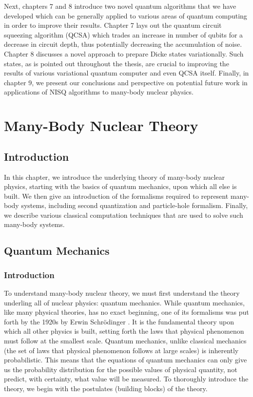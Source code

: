 \documentclass[10pt]{article}
\begin{document}
Next, chapters 7 and 8 introduce two novel quantum algorithms that we have developed which can be generally applied to various areas of quantum computing in order to improve their results. Chapter 7 lays out the quantum circuit squeezing algorithm (QCSA) which trades an increase in number of qubits for a decrease in circuit depth, thus potentially decreasing the accumulation of noise. Chapter 8 discusses a novel approach to prepare Dicke states variationally. Such states, as is pointed out throughout the thesis, are crucial to improving the results of various variational quantum computer and even QCSA itself. Finally, in chapter 9, we present our conclusions and perspective on potential future work in applications of NISQ algorithms to many-body nuclear physics.

\chapter{Many-Body Nuclear Theory}

\section{Introduction} 

In this chapter, we introduce the underlying theory of many-body nuclear physics, starting with the basics of quantum mechanics, upon which all else is built. We then give an introduction of the formalisms required to represent many-body systems, including second quantization and particle-hole formalism. Finally, we describe various classical computation techniques that are used to solve such many-body systems.

\section{Quantum Mechanics}

\subsection{Introduction}

To understand many-body nuclear theory, we must first understand the theory underling all of nuclear physics: quantum mechanics. While quantum mechanics, like many physical theories, has no exact beginning, one of its formalisms was put forth by the 1920s by Erwin Schr\"{o}dinger \cite{schrodinger}. It is the fundamental theory upon which all other physics is built, setting forth the laws that physical phenomenon must follow at the smallest scale. Quantum mechanics, unlike classical mechanics (the set of laws that physical phenomenon follows at large scales) is inherently probabilistic. This means that the equations of quantum mechanics can only give us the probability distribution for the possible values of physical quantity, not predict, with certainty, what value will be measured. To thoroughly introduce the theory, we begin with the postulates (building blocks) of the theory.
\end{document}
